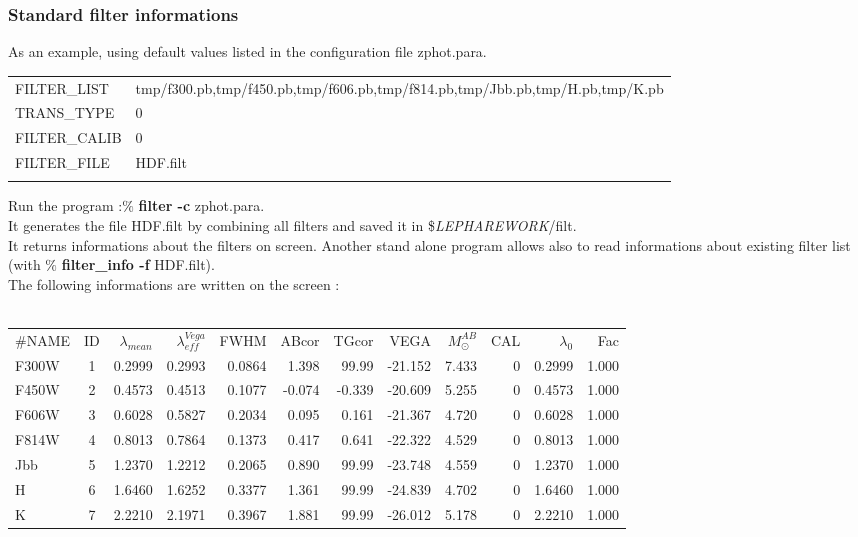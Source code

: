 \documentclass[12pt]{article}
\begin{document}
\subsubsection{Standard filter informations} 
 As an example, using  default values listed in the configuration file zphot.para. \\
\begin{tabular}{ll} 
\hline
FILTER\_LIST     &  tmp/f300.pb,tmp/f450.pb,tmp/f606.pb,tmp/f814.pb,tmp/Jbb.pb,tmp/H.pb,tmp/K.pb \\
TRANS\_TYPE    &    0                                                                        \\
FILTER\_CALIB  &    0                                                                        \\
FILTER\_FILE    &    HDF.filt                                                               \\
\hline \\
\end{tabular}
%
%
 Run the program :$\%$ {\bf filter -c} zphot.para. \\
  It generates the file HDF.filt  by combining all  filters and saved it in \${\it LEPHAREWORK}/filt. \\
  It  returns informations about the filters on screen. 
  Another stand alone program allows also to read informations about existing filter list 
  (with $\%$ {\bf filter\_info  -f}  HDF.filt).  \\
  The following informations are written on the screen : \\
  \\
\noindent
\begin{tabular}{lcrrrrrrr|rrr}
\#NAME&ID&$\lambda_{mean}$&$\lambda_{eff}^{Vega}$& FWHM & ABcor& TGcor&VEGA&  $M_{\odot}^{AB}$& CAL &   $\lambda_{0}$ &  Fac \\
F300W&1 & 0.2999 & 0.2993 & 0.0864 & 1.398&99.99 & -21.152 & 7.433 &0& 0.2999 & 1.000  \\
F450W&2 & 0.4573 & 0.4513 & 0.1077 &-0.074&-0.339& -20.609 & 5.255 &0& 0.4573 & 1.000  \\
F606W&3 & 0.6028 &0.5827  &0.2034  &0.095 & 0.161 &-21.367 & 4.720 &0& 0.6028 & 1.000  \\
F814W&4 & 0.8013 &0.7864  &0.1373  &0.417 & 0.641 &-22.322 & 4.529 &0& 0.8013 & 1.000  \\
Jbb      &5 & 1.2370 &1.2212  &0.2065  &0.890 & 99.99 &-23.748 & 4.559 &0& 1.2370 & 1.000  \\
H        & 6 & 1.6460 &1.6252  & 0.3377 & 1.361& 99.99 &-24.839 & 4.702 &0& 1.6460 & 1.000  \\
K        & 7 &  2.2210& 2.1971 & 0.3967 & 1.881& 99.99 &-26.012 & 5.178 &0& 2.2210 & 1.000\\
\end{tabular}
\end{document}
